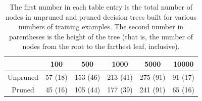 \begin{table}
    \centering
    \begin{tabular}{|c|c|c|c|c|c|}
        \hline
        & 100 & 500 & 1000 & 5000 & 10000 \\
        \hline
        Unpruned & 57 (18) & 153 (46) & 213 (41) & 275 (91) & 91 (17) \\
        \hline
        Pruned  & 45 (16) & 105 (44)  & 177 (39) & 241 (91) & 65 (16) \\
        \hline
    \end{tabular}
    \caption{The first number in each table entry is the total number of nodes in unpruned and pruned decision trees built for various numbers of training examples. The second number in parentheses is the height of the tree (that is, the number of nodes from the root to the farthest leaf, inclusive).}
    \label{table:dt_sizes}
\end{table}

